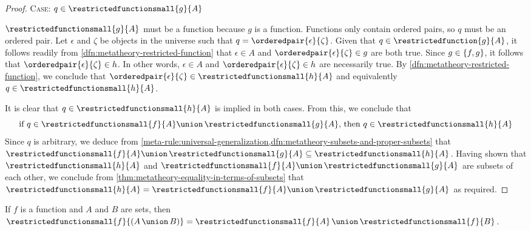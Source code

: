 \begin{proof}
    \vspace{0.3cm}
    \noindent
    {\scshape Case:} \( q \in \restrictedfunctionsmall{g}{A} \)

    \vspace{0.1cm}
    \noindent
    \( \restrictedfunctionsmall{g}{A} \) must be a function because \( g \) is a function.
    Functions only contain ordered pairs, so \( q \) must be an ordered pair.
    Let \( \epsilon \) and \( \zeta \) be objects in the universe such that \( q = \orderedpair{\epsilon}{\zeta} \).
    Given that \( q \in \restrictedfunction{g}{A} \), it follows readily from \cref{dfn:metatheory-restricted-function}
    that \( \epsilon \in A \) and \( \orderedpair{\epsilon}{\zeta} \in g \) are both true.
    Since \( g \in \mleft\{ f, g \mright\} \), it follows that \( \orderedpair{\epsilon}{\zeta} \in h \).
    In other words, \( \epsilon \in A \) and \( \orderedpair{\epsilon}{\zeta} \in h \) are necessarily true.
    By \cref{dfn:metatheory-restricted-function}, we conclude that \( \orderedpair{\epsilon}{\zeta} \in \restrictedfunctionsmall{h}{A} \)
    and equivalently \( q \in \restrictedfunctionsmall{h}{A} \).

    \vspace{0.3cm}
    \noindent
    It is clear that \( q \in \restrictedfunctionsmall{h}{A} \) is implied in both cases. From this, we conclude that
    \begin{equation*}
        \text{if \( q \in \restrictedfunctionsmall{f}{A} \union \, \restrictedfunctionsmall{g}{A} \), then \( q \in \restrictedfunctionsmall{h}{A} \)}
    \end{equation*}
    Since \( q \) is arbitrary, we deduce from \cref{meta-rule:universal-generalization,dfn:metatheory-subsets-and-proper-subsets} that
    \( \restrictedfunctionsmall{f}{A} \union \, \restrictedfunctionsmall{g}{A} \subseteq \restrictedfunctionsmall{h}{A} \).
    Having shown that \( \restrictedfunctionsmall{h}{A} \) and \( \restrictedfunctionsmall{f}{A} \union \, \restrictedfunctionsmall{g}{A} \) are subsets of each
    other, we conclude from \cref{thm:metatheory-equality-in-terms-of-subsets} that
    \( \restrictedfunctionsmall{h}{A} = \restrictedfunctionsmall{f}{A} \union \, \restrictedfunctionsmall{g}{A} \) as required.
\end{proof}

\begin{thm}
     \label{thm:metatheory-a-function-restricted-to-the-union-of-two-sets-is-the-union-of-the-function-restricted-to-each-set}
    If \( f \) is a function and \( A \) and \( B \) are sets, then \( \restrictedfunctionsmall{f}{\mleft( A \,{\union}\, B \mright)} = \restrictedfunctionsmall{f}{A} \,{\union}\, \restrictedfunctionsmall{f}{B} \).
\end{thm}

